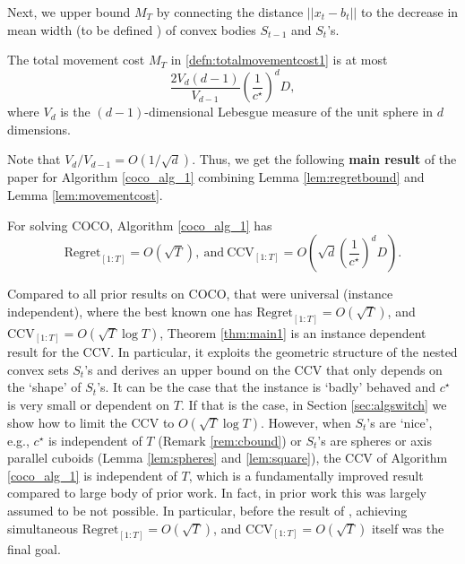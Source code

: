 Next, we upper bound $M_T$ by connecting the distance $||x_t-b_t||$ to the decrease in mean width (to be defined ) of convex bodies $S_{t-1}$ and $S_t$'s.
 
 \begin{lemma}\label{lem:movementcost}
 The total movement cost 
$M_T$ in \eqref{defn:totalmovementcost1} is at most $$\frac{2V_d(d-1)}{V_{d-1}} \left(\frac{1}{c^\star}\right)^{d}D,$$ where 
$V_d$ is the $(d-1)$-dimensional Lebesgue measure of  the unit sphere in $d$ dimensions. 
\end{lemma}

Note that $V_d/V_{d-1} = O(1/\sqrt{d})$.
 Thus, we get the following {\bf main result} of the paper for Algorithm \ref{coco_alg_1} combining Lemma \ref{lem:regretbound} and Lemma \ref{lem:movementcost}. 
 \begin{theorem}\label{thm:main1}
For solving COCO, Algorithm \ref{coco_alg_1} has  $$\textrm{Regret}_{[1:T]} = O(\sqrt{T}), \ \text{and} \ \text{CCV}_{[1:T]}= O\left(\sqrt{d} \left(\frac{1}{c^\star}\right)^{d}D\right).$$
\end{theorem}

Compared to all prior results on COCO, that were universal (instance independent), where the best known one \cite{Sinha2024} has $\textrm{Regret}_{[1:T]} = O(\sqrt{T})$, and $\text{CCV}_{[1:T]}=O(\sqrt{T}\log T)$, Theorem \ref{thm:main1} is an instance 
dependent result for the CCV. In particular, it exploits the geometric structure of the nested convex sets $S_t$'s and 
derives an upper bound on the CCV that only depends on the `shape' of $S_t$'s. It can be the case that the instance is `badly' behaved and $c^\star$ is very small or dependent on $T$. If that is the case, in Section \ref{sec:algswitch} we show how to limit the CCV to $O(\sqrt{T}\log T)$. However, when $S_t$'s are `nice', e.g., $c^\star$ is independent of $T$ (Remark \ref{rem:cbound}) or $S_t$'s are spheres or axis parallel cuboids (Lemma \ref{lem:spheres} and \ref{lem:square}), the $\text{CCV}$ of Algorithm \ref{coco_alg_1} is independent of $T$, which is a fundamentally improved result compared to large body of prior work. In fact, in prior work this was largely assumed to be not possible. In particular, before the result of \cite{Sinha2024}, achieving simultaneous $\textrm{Regret}_{[1:T]} = O(\sqrt{T})$, and $\text{CCV}_{[1:T]}=O(\sqrt{T})$ itself was the final goal.




